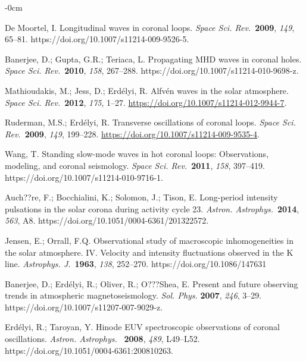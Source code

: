 \documentclass[physics,article,accept,pdftex,moreauthors]{Definitions/mdpi}
\newcommand{\aap}{{\it Astron. Astrophys.}}
\newcommand{\apj}{{\it Astrophys. J.}}
\newcommand{\ssr}{{\it Space Sci. Rev.}}
\begin{document}
\begin{adjustwidth}{-\extralength}{0cm}
\begin{thebibliography}{999}
De Moortel, I. Longitudinal waves in coronal loops. \ssr~\textbf{2009}, \emph{149}, 
65--81. https://doi.org/10.1007/s11214-009-9526-5.
		
		 Banerjee, D.; Gupta, G.R.; Teriaca, L. Propagating MHD waves in coronal holes. \ssr~\textbf{2010}, \emph{158}, 267--288. https://doi.org/10.1007/s11214-010-9698-z.
		
		 Mathioudakis, M.; Jess, D.; Erd\'elyi, R. Alfv\'en waves in the solar 
atmosphere. \ssr~\textbf{2012}, \emph{175}, 1--27. {\url{https://doi.org/10.1007/s11214-012-9944-7}.} 
		
		 Ruderman, M.S.; Erd\'elyi, R. Transverse oscillations of coronal loops. 
\ssr~\textbf{2009}, \emph{149}, 199--228. {\url{https://doi.org/10.1007/s11214-009-9535-4}.}

 	 Wang, T. {Standing slow-mode waves in hot coronal loops: Observations, modeling, and coronal 
seismology}. \ssr~\textbf{2011}, \emph{158}, 397{--419.}  https://doi.org/10.1007/s11214-010-9716-1.
		
		 Auch??re, F.; Bocchialini, K.; Solomon, J.; Tison, E. Long-period intensity pulsations in the solar corona during activity cycle 23. \aap~\textbf{2014}, \emph{563}, A8. https://doi.org/10.1051/0004-6361/201322572.
		
		 Jensen, E.; Orrall, F.Q. Observational study of macroscopic inhomogeneities in the 
solar atmosphere. IV. Velocity and intensity fluctuations observed in the K line. \apj~\textbf{1963}, \emph{138}, 252{--270.} 
 {https://doi.org/10.1086/147631}
		
		 		Banerjee, D.; Erd\'elyi, R.; Oliver, R.; O???Shea, E. Present and future 
observing trends in atmospheric magnetoseismology. \emph{Sol. Phys.} \textbf{2007}, \emph{246}, 3--29. https://doi.org/10.1007/s11207-007-9029-z.
		
		 Erd\'elyi, R.; Taroyan, Y. Hinode EUV spectroscopic observations of coronal 
oscillations. \aap~ \textbf{2008}, \emph{489}, L49--L52. https://doi.org/10.1051/0004-6361:200810263.
		

\end{thebibliography}
\end{adjustwidth}
\end{document}
